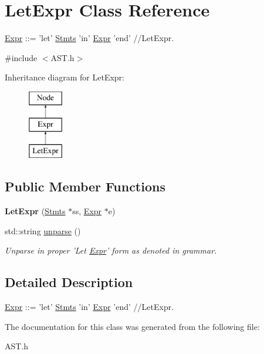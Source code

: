 \hypertarget{classLetExpr}{\section{Let\-Expr Class Reference}
\label{classLetExpr}
}


\hyperlink{classExpr}{Expr} \-:\-:= 'let' \hyperlink{classStmts}{Stmts} 'in' \hyperlink{classExpr}{Expr} 'end' //\-Let\-Expr.  




{\ttfamily \#include $<$A\-S\-T.\-h$>$}

Inheritance diagram for Let\-Expr\-:\begin{figure}[H]
\begin{center}
\leavevmode
\includegraphics[height=3.000000cm]{classLetExpr}
\end{center}
\end{figure}
\subsection*{Public Member Functions}
\begin{DoxyCompactItemize}
\item 
\hypertarget{classLetExpr_a73ee0ccb9d07cdccc88e90d567f9951f}{{\bfseries Let\-Expr} (\hyperlink{classStmts}{Stmts} $\ast$ss, \hyperlink{classExpr}{Expr} $\ast$e)}\label{classLetExpr_a73ee0ccb9d07cdccc88e90d567f9951f}

\item 
\hypertarget{classLetExpr_a47e9e62ebec3114d50c127223fff126b}{std\-::string \hyperlink{classLetExpr_a47e9e62ebec3114d50c127223fff126b}{unparse} ()}\label{classLetExpr_a47e9e62ebec3114d50c127223fff126b}

\begin{DoxyCompactList}\small\item\em Unparse in proper 'Let \hyperlink{classExpr}{Expr}' form as denoted in grammar. \end{DoxyCompactList}\end{DoxyCompactItemize}


\subsection{Detailed Description}
\hyperlink{classExpr}{Expr} \-:\-:= 'let' \hyperlink{classStmts}{Stmts} 'in' \hyperlink{classExpr}{Expr} 'end' //\-Let\-Expr. 

The documentation for this class was generated from the following file\-:\begin{DoxyCompactItemize}
\item 
A\-S\-T.\-h\end{DoxyCompactItemize}
